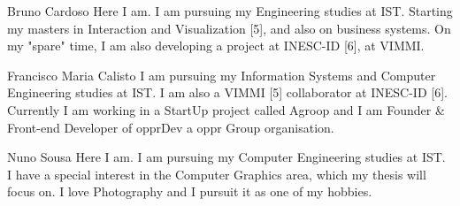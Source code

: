 \documentclass[a4paper,12pt,journal,twoside,compsoc]{PPIEEEtran}
\begin{document}

%
% 
\begin{IEEEbiography}{Bruno Cardoso}
Here I am. I am pursuing my Engineering studies at \ac{IST}. Starting my masters in Interaction and Visualization [5], and also on business systems. On my "spare" time, I am also developing a project at INESC-ID [6], at VIMMI.
\end{IEEEbiography}
\begin{IEEEbiography}
{Francisco Maria Calisto}
I am pursuing my Information Systems and Computer  Engineering studies at \ac{IST}. I am also a VIMMI [5] collaborator at INESC-ID [6]. Currently I am working in a StartUp project called Agroop and I am Founder \& Front-end Developer of opprDev a oppr Group organisation.
\end{IEEEbiography}
\begin{IEEEbiography}
{Nuno Sousa}
Here I am. I am pursuing my Computer Engineering studies at \ac{IST}. I have a special interest in the Computer Graphics area, which my thesis will focus on. I love Photography and I pursuit it as one of my hobbies.
\end{IEEEbiography}
\end{document}
